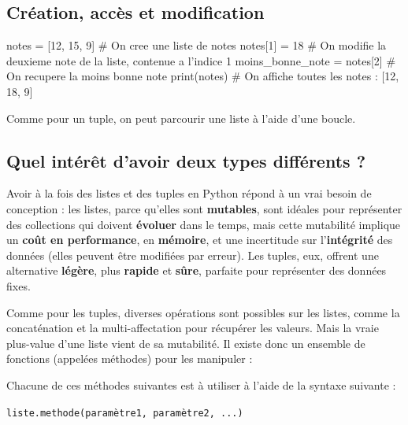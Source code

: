 \documentclass[11pt]{article}
\begin{document}
	\subsection*{Création, accès et modification}
	
	\begin{python}
		notes = [12, 15, 9] # On cree une liste de notes
		notes[1] = 18 # On modifie la deuxieme note de la liste, contenue a l'indice 1
		moins_bonne_note = notes[2] # On recupere la moins bonne note
		print(notes)  # On affiche toutes les notes : [12, 18, 9]\end{python}
		
	Comme pour un tuple, on peut parcourir une liste à l'aide d'une boucle.
		
		
		
		\subsection*{Quel intérêt d'avoir deux types différents ?}
		
		Avoir à la fois des listes et des tuples en Python répond à un vrai besoin de conception : les listes, parce qu’elles sont \textbf{mutables}, sont idéales pour représenter des collections qui doivent \textbf{évoluer} dans le temps, mais cette mutabilité implique un \textbf{coût en performance}, en \textbf{mémoire}, et une incertitude sur l’\textbf{intégrité} des données (elles peuvent être modifiées par erreur). Les tuples, eux, offrent une alternative \textbf{légère}, plus \textbf{rapide} et \textbf{sûre}, parfaite pour représenter des données fixes.
		
		
		
		Comme pour les tuples, diverses opérations sont possibles sur les listes, comme la concaténation et la multi-affectation pour récupérer les valeurs. Mais la vraie plus-value d'une liste vient de sa mutabilité. Il existe donc un ensemble de fonctions (appelées méthodes) pour les manipuler :
		
		Chacune de ces méthodes suivantes est à utiliser à l'aide de la syntaxe suivante :
		
		\begin{center}
			\texttt{liste.methode(paramètre1, paramètre2, ...)}
		\end{center}
	
\end{document}
